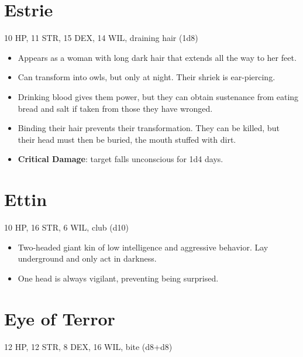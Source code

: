 \documentclass[
  10pt,
  american,
]{article}
\begin{document}
\hypertarget{estrie}{%
\section{Estrie}\label{estrie}}

10 HP, 11 STR, 15 DEX, 14 WIL, draining hair (1d8)

\begin{samepage}
\begin{itemize}
\setlength\itemsep{-.5em}
\item Appears as a woman with long dark hair that extends all the way to her feet.
\item Can transform into owls, but only at night. Their shriek is ear-piercing.
\item Drinking blood gives them power, but they can obtain sustenance from eating bread and salt if taken from those they have wronged.
\item Binding their hair prevents their transformation. They can be killed, but their head must then be buried, the mouth stuffed with dirt.
\item \textbf{Critical Damage}: target falls unconscious for 1d4 days.

\end{itemize}
\end{samepage}

\hypertarget{ettin}{%
\section{Ettin}\label{ettin}}

10 HP, 16 STR, 6 WIL, club (d10)

\begin{samepage}
\begin{itemize}
\setlength\itemsep{-.5em}
\item Two-headed giant kin of low intelligence and aggressive behavior.   Lay underground and only act in darkness.
\item One head is always vigilant, preventing being surprised.
\end{itemize}
\end{samepage}

\hypertarget{eye-of-terror}{%
\section{Eye of Terror}\label{eye-of-terror}}

12 HP, 12 STR, 8 DEX, 16 WIL, bite (d8+d8)
\end{document}
